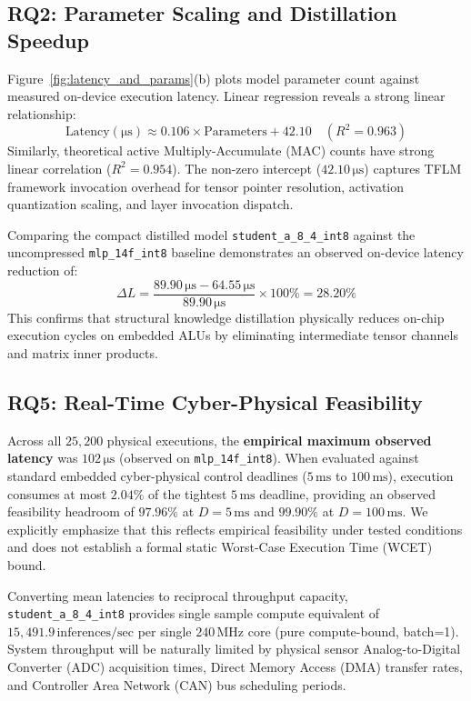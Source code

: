 \documentclass[journal,10pt]{IEEEtran}
\begin{document}
\subsection{RQ2: Parameter Scaling and Distillation Speedup}
Figure~\ref{fig:latency_and_params}(b) plots model parameter count against measured on-device execution latency. Linear regression reveals a strong linear relationship:
\begin{equation}
    \text{Latency} (\si{\micro\second}) \approx 0.106 \times \text{Parameters} + 42.10 \quad (R^2 = 0.963)
\end{equation}
Similarly, theoretical active Multiply-Accumulate (MAC) counts have strong linear correlation ($R^2 = 0.954$). The non-zero intercept ($42.10\,\si{\micro\second}$) captures TFLM framework invocation overhead for tensor pointer resolution, activation quantization scaling, and layer invocation dispatch.

Comparing the compact distilled model \texttt{student\_a\_8\_4\_int8} against the uncompressed \texttt{mlp\_14f\_int8} baseline demonstrates an observed on-device latency reduction of:
\begin{equation}
    \Delta L = \frac{89.90\,\si{\micro\second} - 64.55\,\si{\micro\second}}{89.90\,\si{\micro\second}} \times 100\% = \mathbf{28.20\%}
\end{equation}
This confirms that structural knowledge distillation physically reduces on-chip execution cycles on embedded ALUs by eliminating intermediate tensor channels and matrix inner products.

\subsection{RQ5: Real-Time Cyber-Physical Feasibility}
Across all $25,200$ physical executions, the \textbf{empirical maximum observed latency} was $102\,\si{\micro\second}$ (observed on \texttt{mlp\_14f\_int8}). When evaluated against standard embedded cyber-physical control deadlines ($5\,\text{ms}$ to $100\,\text{ms}$), execution consumes at most $2.04\%$ of the tightest $5\,\text{ms}$ deadline, providing an observed feasibility headroom of $\mathbf{97.96\%}$ at $D=5\,\text{ms}$ and $\mathbf{99.90\%}$ at $D=100\,\text{ms}$. We explicitly emphasize that this reflects empirical feasibility under tested conditions and does not establish a formal static Worst-Case Execution Time (WCET) bound.

Converting mean latencies to reciprocal throughput capacity, \texttt{student\_a\_8\_4\_int8} provides single sample compute equivalent of $15,491.9\,\text{inferences/sec}$ per single $240\,\text{MHz}$ core (pure compute-bound, batch=1). System throughput will be naturally limited by physical sensor Analog-to-Digital Converter (ADC) acquisition times, Direct Memory Access (DMA) transfer rates, and Controller Area Network (CAN) bus scheduling periods.
\end{document}
